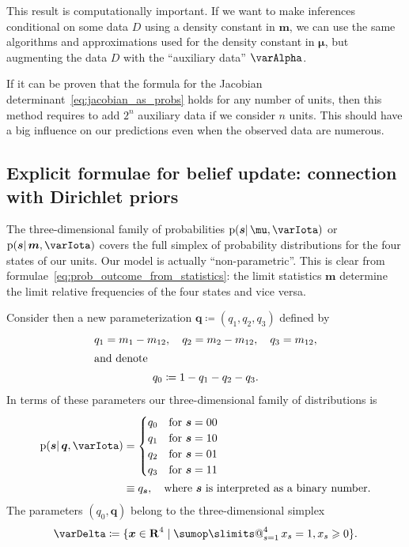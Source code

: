 \documentclass[\ifafour a4paper,12pt,\else a5paper,10pt,\fi%
onecolumn,oneside,article,%
british%
]{memoir}
\makeatletter
\theoremstyle{remark}
\theoremstyle{innote}
\def\sum{\DOTSI\sumop\slimits@}
\newcommand*{\RR}{\bm{\mathrm{R}}}
\newcommand*{\defd}{\coloneqq}
\newcommand*{\suchthat}{\mid}%
\renewcommand{\ge}{\geqslant}%
\DeclarePairedDelimiter\set{\{}{\}}
\newcommand*{\pf}{\mathrm{p}}%
\renewcommand*{\|}{\mathpunct{|}}
\newcommand*{\tsum}{\mathop{\textstyle\sum}\nolimits}
\newcommand*{\yI}{\varIota}
\newcommand*{\ys}{\bm{s}}
\newcommand*{\yD}{D}
\newcommand*{\yA}{\varAlpha}
\newcommand*{\yth}{\bm{\mu}}
\newcommand*{\yt}{\bm{m}}
\newcommand*{\yl}{m_{12}}
\newcommand*{\yq}{\bm{q}}
\newcommand*{\yql}{q_{3}}
\newcommand*{\simpl}{\varDelta}
\makeatother
\begin{document}
This result is computationally important. If we want to make inferences
conditional on some data $\yD$ using a density constant in $\yt$, we can
use the same algorithms and approximations used for the density constant in
$\yth$, but augmenting the data $\yD$ with the \enquote{auxiliary data} $\yA$.

If it can be proven that the formula for the Jacobian
determinant~\eqref{eq:jacobian_as_probs} holds for any number of units,
then this method requires to add $2^n$ auxiliary data if we consider $n$
units. This should have a big influence on our predictions even when the
observed data are numerous.

\subsection{Explicit formulae for belief update: connection with Dirichlet priors}
\label{sec:explicit_dirichlet}

The three-dimensional family of probabilities $\pf(\ys \| \yth, \yI)$ or
$\pf(\ys \|\yt,\yI)$ covers the full simplex of probability distributions
for the four states of our units. Our model is actually
\enquote{non-parametric}. This is clear from
formulae~\eqref{eq:prob_outcome_from_statistics}: the limit statistics
$\yt$ determine the limit relative frequencies of the four states and vice
versa.

Consider then a new parameterization $\yq\defd(q_1,q_2,\yql)$ defined by
\begin{gather}
  \label{eq:params_q}
  q_1 = m_1-\yl,\quad q_2=m_2-\yl, \quad \yql = \yl,
  \\\shortintertext{and denote}
  q_0 \defd 1-q_1-q_2-\yql.
\end{gather}
In terms of these parameters our three-dimensional family of distributions
is
\begin{multline}
  \label{eq:prob_parametr_q}
  \begin{aligned}
  \pf(\ys \| \yq,\yI) &=
  \begin{cases}
     q_0 &\text{for } \ys=00\\
    q_1 &\text{for } \ys=10\\
    q_2 &\text{for } \ys=01\\
    \yql &\text{for } \ys=11
  \end{cases}
  \\
&\equiv q_{\ys},\quad\text{where $\ys$ is interpreted as a binary number.}  
  \end{aligned}
\end{multline}
The parameters $(q_0,\yq)$ belong to the three-dimensional simplex
\begin{equation}
\simpl \defd \set{\bm{x} \in \RR^4 \suchthat 
  \tsum_{s=1}^4 x_s=1, x_s\ge 0}.
\label{eq:simplex}
\end{equation}
\end{document}
